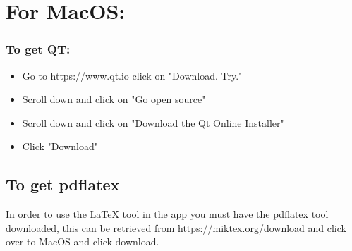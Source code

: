   \bigskip
  \section{For MacOS:}
  \subsubsection*{To get QT:}
    \begin{itemize}
      \item Go to https://www.qt.io click on "Download. Try."
      \item Scroll down and click on "Go open source"
      \item Scroll down and click on "Download the Qt Online Installer"
      \item Click "Download"
    \end{itemize}
    \subsection*{To get pdflatex}
    In order to use the LaTeX tool in the app you must have the pdflatex tool downloaded, this can be retrieved from https://miktex.org/download and click over to MacOS and click download.
